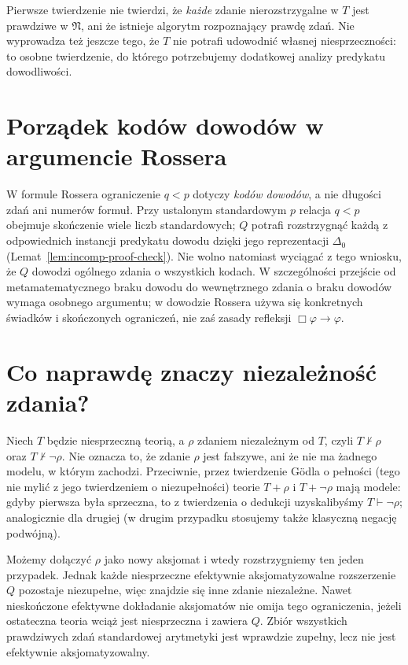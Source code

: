 \begin{uwaga}
Pierwsze twierdzenie nie twierdzi, że \emph{każde}
zdanie nierozstrzygalne w $T$ jest prawdziwe w $\mathfrak N$,
ani że istnieje algorytm rozpoznający prawdę zdań.
Nie wyprowadza też jeszcze tego, że $T$ nie potrafi
udowodnić własnej niesprzeczności: to osobne twierdzenie,
do którego potrzebujemy dodatkowej analizy predykatu dowodliwości.
\end{uwaga}


\section{Porządek kodów dowodów w argumencie Rossera}
W formule Rossera ograniczenie $q<p$ dotyczy \emph{kodów dowodów},
a nie długości zdań ani numerów formuł. Przy ustalonym standardowym
$p$ relacja $q<p$ obejmuje skończenie wiele liczb standardowych;
$Q$ potrafi rozstrzygnąć każdą z odpowiednich instancji
predykatu dowodu dzięki jego reprezentacji $\Delta_0$
(Lemat~\ref{lem:incomp-proof-check}). Nie wolno natomiast wyciągać z tego
wniosku, że $Q$ dowodzi ogólnego zdania o wszystkich kodach.
W szczególności przejście od metamatematycznego braku dowodu do
wewnętrznego zdania o braku dowodów wymaga osobnego argumentu;
w dowodzie Rossera używa się konkretnych świadków i skończonych
ograniczeń, nie zaś zasady refleksji $\Box\varphi\to\varphi$.

\section{Co naprawdę znaczy niezależność zdania?}
\begin{uwaga}
Niech $T$ będzie niesprzeczną teorią, a $\rho$ zdaniem niezależnym od $T$,
czyli $T\nvdash\rho$ oraz $T\nvdash\neg\rho$.
Nie oznacza to, że zdanie $\rho$ jest fałszywe, ani że nie ma żadnego modelu,
w którym zachodzi. Przeciwnie, przez twierdzenie Gödla o pełności
(tego nie mylić z jego twierdzeniem o niezupełności)
teorie $T+\rho$ i $T+\neg\rho$ mają modele:
gdyby pierwsza była sprzeczna, to z twierdzenia o dedukcji
uzyskalibyśmy $T\vdash\neg\rho$; analogicznie dla drugiej
(w drugim przypadku stosujemy także klasyczną negację podwójną).

Możemy dołączyć $\rho$ jako nowy aksjomat i wtedy rozstrzygniemy ten jeden przypadek.
Jednak każde niesprzeczne efektywnie aksjomatyzowalne rozszerzenie $Q$
pozostaje niezupełne, więc znajdzie się inne zdanie niezależne.
Nawet nieskończone efektywne dokładanie aksjomatów nie omija tego ograniczenia,
jeżeli ostateczna teoria wciąż jest niesprzeczna i zawiera $Q$.
Zbiór wszystkich prawdziwych zdań standardowej arytmetyki
jest wprawdzie zupełny, lecz nie jest efektywnie aksjomatyzowalny.
\end{uwaga}

